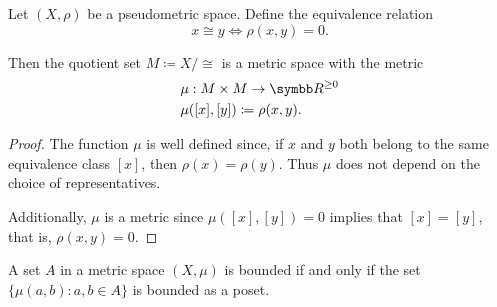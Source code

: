 \begin{proposition}\label{thm:pseudometric_to_metric}
  Let \( (X, \rho) \) be a pseudometric space. Define the equivalence relation
  \begin{equation*}
    x \cong y \iff \rho(x, y) = 0.
  \end{equation*}

  Then the quotient set \( M \coloneqq X / \cong \) is a metric space with the metric
  \begin{align*}
    &\mu: M \times M \to \R^{\geq 0} \\
    &\mu([x], [y]) \coloneqq \rho(x, y).
  \end{align*}
\end{proposition}
\begin{proof}
  The function \( \mu \) is well defined since, if \( x \) and \( y \) both belong to the same equivalence class \( [x] \), then \( \rho(x) = \rho(y) \). Thus \( \mu \) does not depend on the choice of representatives.

  Additionally, \( \mu \) is a metric since \( \mu([x], [y]) = 0 \) implies that \( [x] = [y] \), that is, \( \rho(x, y) = 0 \).
\end{proof}

\begin{proposition}\label{remark:bounded_set_metric_order_equivalence}
  A set \( A \) in a metric space \( (X, \mu) \) is bounded if and only if the set \( \{ \mu(a, b) \colon a, b \in A \} \) is bounded as a poset.
\end{proposition}

